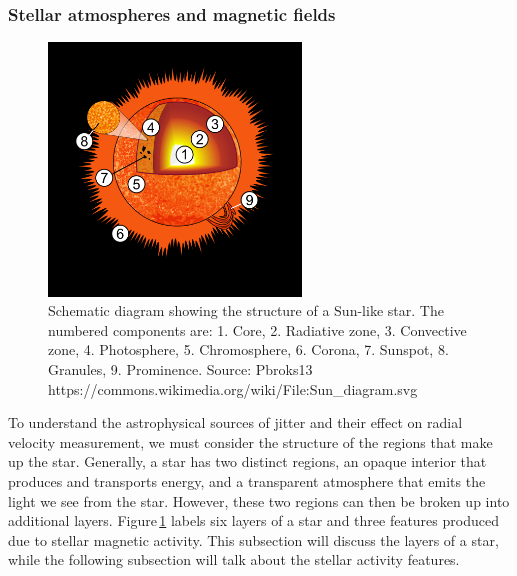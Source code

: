 \subsubsection{Stellar atmospheres and magnetic fields}
\label{secStelAtmos}
\begin{figure}
    \centering
    \includegraphics[width=0.6\textwidth]{Sun_diagram.png}
    \caption{Schematic diagram showing the structure of a Sun-like star. The numbered components are:  1. Core, 2. Radiative zone, 3. Convective zone, 4. Photosphere, 5. Chromosphere, 6. Corona, 7. Sunspot, 8. Granules, 9. Prominence. Source: Pbroks13 https://commons.wikimedia.org/wiki/File:Sun\_diagram.svg}
    \label{figStarLayer}
\end{figure}

To understand the astrophysical sources of jitter and their effect on radial velocity measurement, we must consider the structure of the regions that make up the star. Generally, a star has two distinct regions, an opaque interior that produces and transports energy, and a transparent atmosphere that emits the light we see from the star. However, these two regions can then be broken up into additional layers. Figure\,\ref{figStarLayer} labels six layers of a star and three features produced due to stellar magnetic activity. This subsection will discuss the layers of a star, while the following subsection will talk about the stellar activity features.\\

